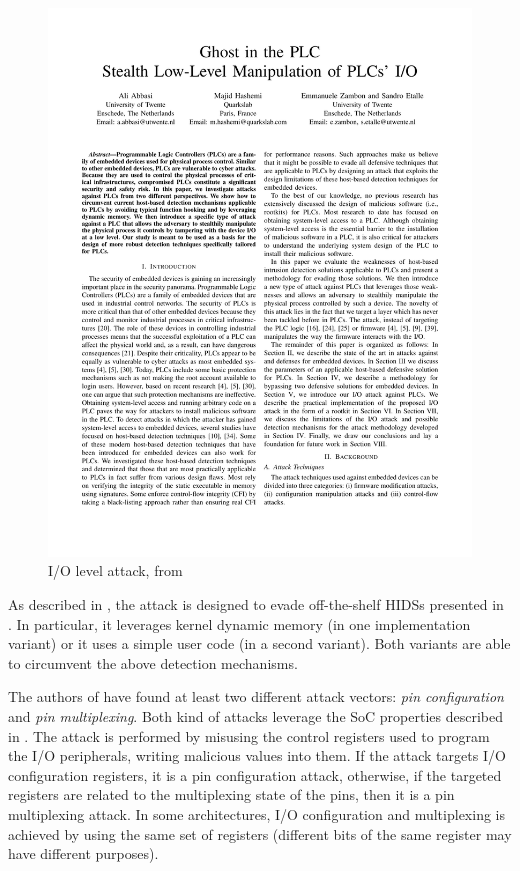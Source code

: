 \begin{figure}[h]
\centerline{\includegraphics[page=6,viewport=50 620 300 750,clip]{res/ghostplc}}
\caption{I/O level attack, from \cite{ghostplc} \label{fig:target}}
\end{figure}

As described in \cite{ghostplc}, the attack is designed to evade off-the-shelf HIDSs presented in .
In particular, it leverages kernel dynamic memory (in one implementation variant) or it uses a simple user code (in a second variant).
Both variants are able to circumvent the above detection mechanisms.

The authors of \cite{ghostplc} have found at least two different attack vectors: \emph{pin configuration} and \emph{pin multiplexing}.
Both kind of attacks leverage the SoC properties described in .
The attack is performed by misusing the control registers used to program the I/O peripherals, writing malicious values into them.
If the attack targets I/O configuration registers, it is a pin configuration attack, otherwise, if the targeted registers are related to the multiplexing state of the pins,
then it is a pin multiplexing attack. In some architectures, I/O configuration and multiplexing is achieved by using the same set of registers
(\eg different bits of the same register may have different purposes).

